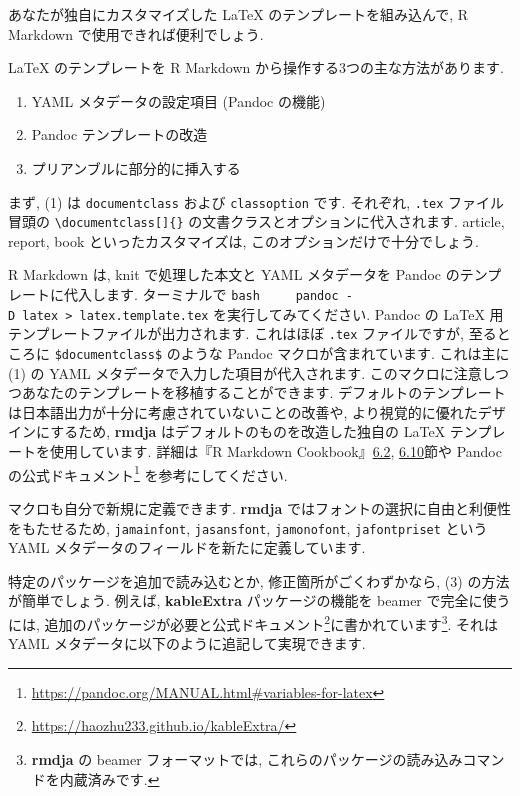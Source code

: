 \documentclass[
]{ltjsarticle}
\providecommand{\tightlist}{%
  \setlength{\itemsep}{0pt}\setlength{\parskip}{0pt}}
\begin{document}
あなたが独自にカスタマイズした LaTeX のテンプレートを組み込んで, R Markdown で使用できれば便利でしょう.

LaTeX のテンプレートを R Markdown から操作する3つの主な方法があります.

\begin{enumerate}
\def\labelenumi{\arabic{enumi}.}
\tightlist
\item
  YAML メタデータの設定項目 (Pandoc の機能)
\item
  Pandoc テンプレートの改造
\item
  プリアンブルに部分的に挿入する
\end{enumerate}

まず, (1) は \texttt{documentclass} および \texttt{classoption} です. それぞれ, \texttt{.tex} ファイル冒頭の \texttt{\textbackslash{}documentclass{[}{]}\{\}} の文書クラスとオプションに代入されます. article, report, book といったカスタマイズは, このオプションだけで十分でしょう.

R Markdown は, knit で処理した本文と YAML メタデータを Pandoc のテンプレートに代入します. ターミナルで
\texttt{bash\ \ \ \ \ pandoc\ -D\ latex\ \textgreater{}\ latex.template.tex}
を実行してみてください. Pandoc の LaTeX 用テンプレートファイルが出力されます. これはほぼ \texttt{.tex} ファイルですが, 至るところに \texttt{\$documentclass\$} のような Pandoc マクロが含まれています. これは主に (1) の YAML メタデータで入力した項目が代入されます. このマクロに注意しつつあなたのテンプレートを移植することができます. デフォルトのテンプレートは日本語出力が十分に考慮されていないことの改善や, より視覚的に優れたデザインにするため, \textbf{rmdja} はデフォルトのものを改造した独自の LaTeX テンプレートを使用しています. 詳細は『R Markdown Cookbook』\href{https://gedevan-aleksizde.github.io/rmarkdown-cookbook/latex-variables.html}{6.2}, \href{https://gedevan-aleksizde.github.io/rmarkdown-cookbook/latex-template.html}{6.10}節や Pandoc の公式ドキュメント\footnote{ \url{https://pandoc.org/MANUAL.html\#variables-for-latex}} を参考にしてください.

マクロも自分で新規に定義できます. \textbf{rmdja} ではフォントの選択に自由と利便性をもたせるため, \texttt{jamainfont}, \texttt{jasansfont}, \texttt{jamonofont}, \texttt{jafontpriset} という YAML メタデータのフィールドを新たに定義しています.

特定のパッケージを追加で読み込むとか, 修正箇所がごくわずかなら, (3) の方法が簡単でしょう. 例えば, \textbf{kableExtra} パッケージの機能を beamer で完全に使うには, 追加のパッケージが必要と公式ドキュメント\footnote{\url{https://haozhu233.github.io/kableExtra/}}に書かれています\footnote{\textbf{rmdja} の beamer フォーマットでは, これらのパッケージの読み込みコマンドを内蔵済みです.}. それは YAML メタデータに以下のように追記して実現できます.
\end{document}
